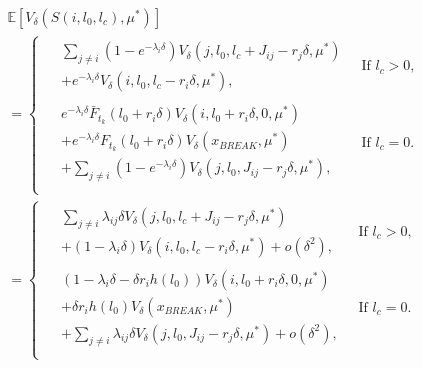 \documentclass[a4paper]{thesis}
\theoremstyle{definition}
\begin{document}
\begin{equation}\label{eq:MmfmNextState}
\begin{split}
&\mathbb{E}[V_\delta(S(i,l_0,l_c),\mu^*)]\\
&=\begin{cases}
\begin{split}
&\sum\limits_{j\neq i}(1-e^{-\lambda_i \delta})V_\delta(j,l_0,l_c+J_{ij}-r_j\delta,\mu^*)\\
&+e^{-\lambda_i \delta}V_\delta(i,l_0,l_c-r_i\delta,\mu^*),
\end{split}&\ \text{If $l_c>0$,}\\
\begin{split}
&e^{-\lambda_i \delta} \bar{F}_{t_k}(l_0+r_i\delta)V_\delta(i,l_0+r_i\delta,0,\mu^*)\\
&+ e^{-\lambda_i \delta}F_{t_k}(l_0+r_i\delta)V_\delta(x_{BREAK},\mu^*)\\
&+\sum\limits_{j\neq i}(1-e^{-\lambda_i \delta})V_\delta(j,l_0,J_{ij}-r_j\delta,\mu^*),
\end{split}&\ \text{If $l_c=0$.}\\
\end{cases}\\
&=\begin{cases}
\begin{split}
&\sum\limits_{j\neq i}\lambda_{ij}\delta V_\delta(j,l_0,l_c+J_{ij}-r_j\delta,\mu^*)\\
&+(1-\lambda_i \delta)V_\delta(i,l_0,l_c-r_i\delta,\mu^*)+o(\delta^2),
\end{split}
&\ \text{If $l_c>0$,}\\
\begin{split}
&(1-\lambda_i \delta-\delta r_ih(l_0))V_\delta(i,l_0+r_i\delta,0,\mu^*)\\
&+ \delta r_ih(l_0)V_\delta(x_{BREAK},\mu^*)\\
&+\sum\limits_{j\neq i}\lambda_{ij} \delta V_\delta(j,l_0,J_{ij}-r_j\delta,\mu^*)+o(\delta^2),
\end{split}&\ \text{If $l_c=0$.}\\
\end{cases}
\end{split}
\end{equation}
\end{document}
